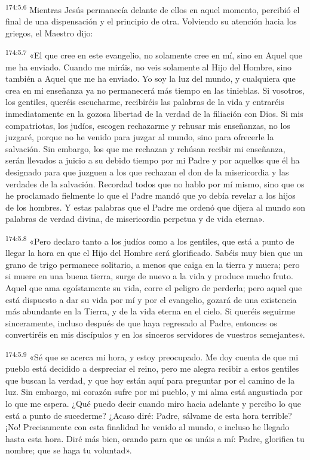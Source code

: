 \par 
\textsuperscript{174:5.6} Mientras Jesús permanecía delante de ellos en aquel momento, percibió el final de una dispensación y el principio de otra. Volviendo su atención hacia los griegos, el Maestro dijo:

\par 
\textsuperscript{174:5.7} «El que cree en este evangelio, no solamente cree en mí, sino en Aquel que me ha enviado. Cuando me miráis, no veis solamente al Hijo del Hombre, sino también a Aquel que me ha enviado. Yo soy la luz del mundo, y cualquiera que crea en mi enseñanza ya no permanecerá más tiempo en las tinieblas. Si vosotros, los gentiles, queréis escucharme, recibiréis las palabras de la vida y entraréis inmediatamente en la gozosa libertad de la verdad de la filiación con Dios. Si mis compatriotas, los judíos, escogen rechazarme y rehusar mis enseñanzas, no los juzgaré, porque no he venido para juzgar al mundo, sino para ofrecerle la salvación. Sin embargo, los que me rechazan y rehúsan recibir mi enseñanza, serán llevados a juicio a su debido tiempo por mi Padre y por aquellos que él ha designado para que juzguen a los que rechazan el don de la misericordia y las verdades de la salvación. Recordad todos que no hablo por mí mismo, sino que os he proclamado fielmente lo que el Padre mandó que yo debía revelar a los hijos de los hombres. Y estas palabras que el Padre me ordenó que dijera al mundo son palabras de verdad divina, de misericordia perpetua y de vida eterna».

\par 
\textsuperscript{174:5.8} «Pero declaro tanto a los judíos como a los gentiles, que está a punto de llegar la hora en que el Hijo del Hombre será glorificado. Sabéis muy bien que un grano de trigo permanece solitario, a menos que caiga en la tierra y muera; pero si muere en una buena tierra, surge de nuevo a la vida y produce mucho fruto. Aquel que ama egoístamente su vida, corre el peligro de perderla; pero aquel que está dispuesto a dar su vida por mí y por el evangelio, gozará de una existencia más abundante en la Tierra, y de la vida eterna en el cielo. Si queréis seguirme sinceramente, incluso después de que haya regresado al Padre, entonces os convertiréis en mis discípulos y en los sinceros servidores de vuestros semejantes».

\par 
\textsuperscript{174:5.9} «Sé que se acerca mi hora, y estoy preocupado. Me doy cuenta de que mi pueblo está decidido a despreciar el reino, pero me alegra recibir a estos gentiles que buscan la verdad, y que hoy están aquí para preguntar por el camino de la luz. Sin embargo, mi corazón sufre por mi pueblo, y mi alma está angustiada por lo que me espera. ¿Qué puedo decir cuando miro hacia adelante y percibo lo que está a punto de sucederme? ¿Acaso diré: Padre, sálvame de esta hora terrible? ¡No! Precisamente con esta finalidad he venido al mundo, e incluso he llegado hasta esta hora. Diré más bien, orando para que os unáis a mí: Padre, glorifica tu nombre; que se haga tu voluntad».

